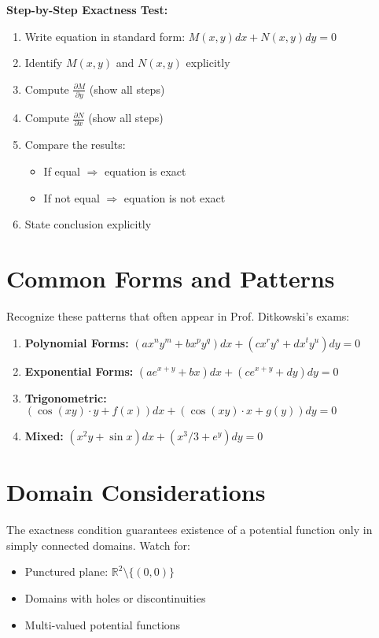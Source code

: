 \documentclass[12pt]{article}
\begin{document}
\begin{algorithm}
\textbf{Step-by-Step Exactness Test:}
\begin{enumerate}
    \item Write equation in standard form: $M(x,y)dx + N(x,y)dy = 0$
    \item Identify $M(x,y)$ and $N(x,y)$ explicitly
    \item Compute $\frac{\partial M}{\partial y}$ (show all steps)
    \item Compute $\frac{\partial N}{\partial x}$ (show all steps)
    \item Compare the results:
    \begin{itemize}
        \item If equal $\Rightarrow$ equation is exact
        \item If not equal $\Rightarrow$ equation is not exact
    \end{itemize}
    \item State conclusion explicitly
\end{enumerate}
\end{algorithm}

\section{Common Forms and Patterns}

\begin{examtip}
Recognize these patterns that often appear in Prof. Ditkowski's exams:
\begin{enumerate}
    \item \textbf{Polynomial Forms:} $(ax^ny^m + bx^py^q)dx + (cx^ry^s + dx^ty^u)dy = 0$
    \item \textbf{Exponential Forms:} $(ae^{x+y} + bx)dx + (ce^{x+y} + dy)dy = 0$
    \item \textbf{Trigonometric:} $(\cos(xy) \cdot y + f(x))dx + (\cos(xy) \cdot x + g(y))dy = 0$
    \item \textbf{Mixed:} $(x^2y + \sin x)dx + (x^3/3 + e^y)dy = 0$
\end{enumerate}
\end{examtip}

\section{Domain Considerations}

\begin{warning}
The exactness condition guarantees existence of a potential function only in simply connected domains. Watch for:
\begin{itemize}
    \item Punctured plane: $\mathbb{R}^2 \setminus \{(0,0)\}$
    \item Domains with holes or discontinuities
    \item Multi-valued potential functions
\end{itemize}
\end{warning}
\end{document}
